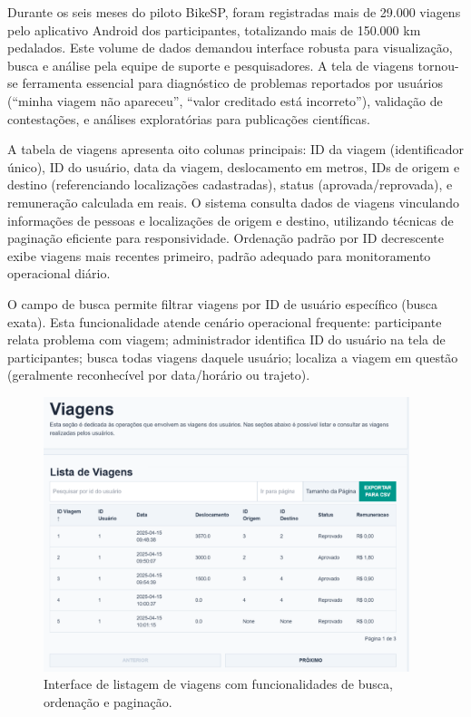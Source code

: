 

Durante os seis meses do piloto BikeSP, foram registradas mais de 29.000 viagens pelo aplicativo Android dos participantes, totalizando mais de 150.000 km pedalados. Este volume de dados demandou interface robusta para visualização, busca e análise pela equipe de suporte e pesquisadores. A tela de viagens tornou-se ferramenta essencial para diagnóstico de problemas reportados por usuários (``minha viagem não apareceu'', ``valor creditado está incorreto''), validação de contestações, e análises exploratórias para publicações científicas.

A tabela de viagens apresenta oito colunas principais: ID da viagem (identificador único), ID do usuário, data da viagem, deslocamento em metros, IDs de origem e destino (referenciando localizações cadastradas), status (aprovada/reprovada), e remuneração calculada em reais. O sistema consulta dados de viagens vinculando informações de pessoas e localizações de origem e destino, utilizando técnicas de paginação eficiente para responsividade. Ordenação padrão por ID decrescente exibe viagens mais recentes primeiro, padrão adequado para monitoramento operacional diário.

O campo de busca permite filtrar viagens por ID de usuário específico (busca exata). Esta funcionalidade atende cenário operacional frequente: participante relata problema com viagem; administrador identifica ID do usuário na tela de participantes; busca todas viagens daquele usuário; localiza a viagem em questão (geralmente reconhecível por data/horário ou trajeto).

 \begin{figure}[H]
   \centering
   \includegraphics[width=0.95\textwidth]{figuras/viagens_listar.png}
   \caption{Interface de listagem de viagens com funcionalidades de busca, ordenação e paginação.}
   \label{fig:viagens_listar}
 \end{figure}

